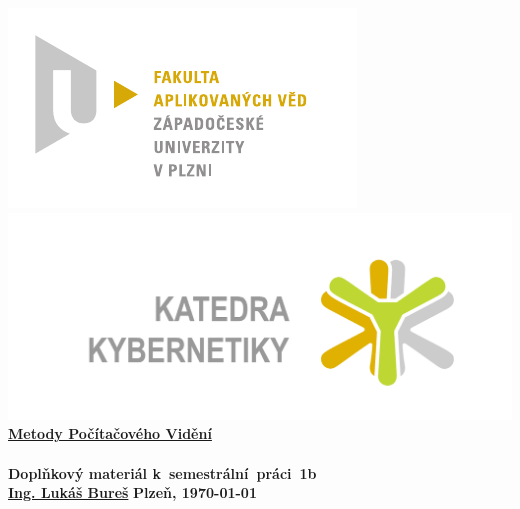 \documentclass[12pt, a4paper]{article}
\begin{document}
 









 
\begin{titlepage}
\begin{center}
	\includegraphics[trim = 0.6cm 0.5cm 0.9cm 0.5cm, scale=1]{FAV_logo_cz.pdf}
	\hspace*{\fill}
	\includegraphics[trim = 3.5cm 1.5cm 2.6cm 2cm, scale=0.295]{./KKY_logo_cz.pdf}\\
	\vspace*{\fill}
	\textbf{\Huge{\href{http://www.kky.zcu.cz/cs/courses/mpv}{Metody Počítačového Vidění} \\ ~ \\ Doplňkový materiál k~semestrální~práci~1b}}\\
	\vspace*{\fill}
	\textbf{\large{\href{mailto:LBures@kky.zcu.cz}{Ing. Lukáš Bureš}}} \hfill \textbf{\large{Plzeň, \today}}
\end{center}
\end{titlepage}












\end{document}
